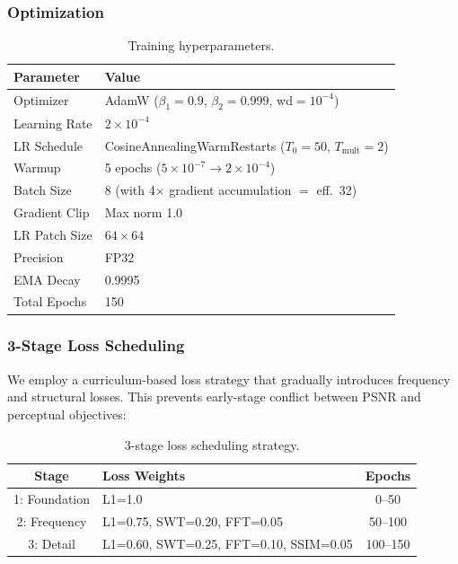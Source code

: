 \documentclass[10pt,twocolumn,letterpaper]{article}
\begin{document}
\subsubsection{Optimization}

\begin{table}[h]
\centering
\small
\begin{tabular}{@{}ll@{}}
\toprule
\textbf{Parameter} & \textbf{Value} \\
\midrule
Optimizer & AdamW ($\beta_1\!=\!0.9$, $\beta_2\!=\!0.999$, wd$\!=\!10^{-4}$) \\
Learning Rate & $2 \times 10^{-4}$ \\
LR Schedule & CosineAnnealingWarmRestarts ($T_0\!=\!50$, $T_\text{mult}\!=\!2$) \\
Warmup & 5 epochs ($5\!\times\!10^{-7} \to 2\!\times\!10^{-4}$) \\
Batch Size & 8 (with 4$\times$ gradient accumulation $=$ eff.\ 32) \\
Gradient Clip & Max norm 1.0 \\
LR Patch Size & $64 \times 64$ \\
Precision & FP32 \\
EMA Decay & 0.9995 \\
Total Epochs & 150 \\
\bottomrule
\end{tabular}
\caption{Training hyperparameters.}
\label{tab:training}
\end{table}

\subsubsection{3-Stage Loss Scheduling}

We employ a curriculum-based loss strategy that gradually introduces frequency and structural losses. This prevents early-stage conflict between PSNR and perceptual objectives:

\begin{table}[h]
\centering
\small
\begin{tabular}{@{}clc@{}}
\toprule
\textbf{Stage} & \textbf{Loss Weights} & \textbf{Epochs} \\
\midrule
1: Foundation & L1=1.0 & 0--50 \\
2: Frequency & L1=0.75, SWT=0.20, FFT=0.05 & 50--100 \\
3: Detail & L1=0.60, SWT=0.25, FFT=0.10, SSIM=0.05 & 100--150 \\
\bottomrule
\end{tabular}
\caption{3-stage loss scheduling strategy.}
\label{tab:loss}
\end{table}
\end{document}
